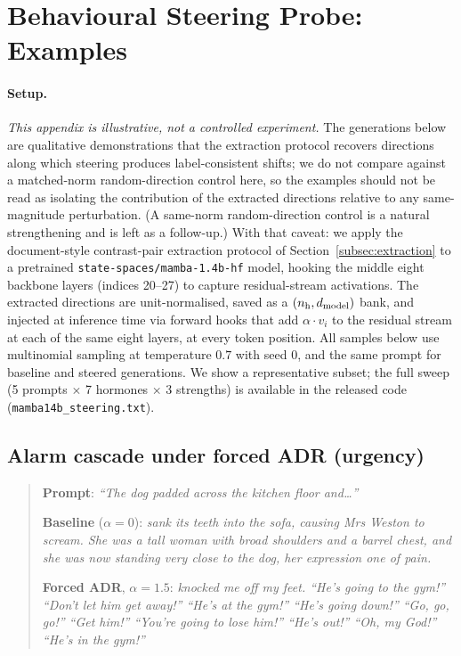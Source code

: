 \section{Behavioural Steering Probe: Examples}
\label{app:steering}

\paragraph{Setup.} \emph{This appendix is illustrative, not a controlled experiment.} The generations below are qualitative demonstrations that the extraction protocol recovers directions along which steering produces label-consistent shifts; we do not compare against a matched-norm random-direction control here, so the examples should not be read as isolating the contribution of the extracted directions relative to any same-magnitude perturbation. (A same-norm random-direction control is a natural strengthening and is left as a follow-up.) With that caveat: we apply the document-style contrast-pair extraction protocol of Section~\ref{subsec:extraction} to a pretrained \texttt{state-spaces/mamba-1.4b-hf} model, hooking the middle eight backbone layers (indices 20--27) to capture residual-stream activations. The extracted directions are unit-normalised, saved as a $(n_{\text{h}}, d_{\text{model}})$ bank, and injected at inference time via forward hooks that add $\alpha \cdot v_i$ to the residual stream at each of the same eight layers, at every token position. All samples below use multinomial sampling at temperature $0.7$ with seed $0$, and the same prompt for baseline and steered generations. We show a representative subset; the full sweep (5 prompts $\times$ 7 hormones $\times$ 3 strengths) is available in the released code (\texttt{mamba14b\_steering.txt}).

\subsection{Alarm cascade under forced ADR (urgency)}

\begin{quote}\small
\textbf{Prompt}: \textit{``The dog padded across the kitchen floor and\ldots''}

\textbf{Baseline} ($\alpha = 0$): \textit{sank its teeth into the sofa, causing Mrs Weston to scream. She was a tall woman with broad shoulders and a barrel chest, and she was now standing very close to the dog, her expression one of pain.}

\textbf{Forced ADR}, $\alpha = 1.5$: \textit{knocked me off my feet. ``He's going to the gym!'' ``Don't let him get away!'' ``He's at the gym!'' ``He's going down!'' ``Go, go, go!'' ``Get him!'' ``You're going to lose him!'' ``He's out!'' ``Oh, my God!'' ``He's in the gym!''}
\end{quote}

